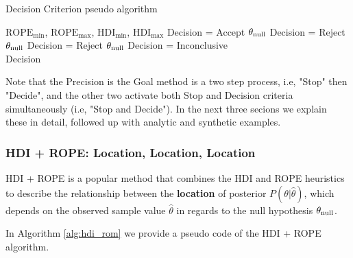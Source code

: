 \begin{algorithm}
    \caption{Decision Criterion pseudo algorithm}\label{alg:decision_criterion}
    \begin{algorithmic}
    \Require $\mathrm{ROPE}_\mathrm{min}$, $\mathrm{ROPE}_\mathrm{max}$, $\mathrm{HDI}_\mathrm{min}$, $\mathrm{HDI}_\mathrm{max}$
        \State Decision = Accept $\theta_{\rm null}$ 
        \State Decision = Reject $\theta_{\rm null}$ 
        \State Decision = Reject $\theta_{\rm null}$ 
    \Else
    \State Decision = Inconclusive  
    \EndIf \\
    \Return Decision
    \end{algorithmic} 
    
\end{algorithm}


Note that the Precision is the Goal method is a two step process, 
i.e, "Stop" then "Decide",
and the other two activate both Stop and Decision criteria simultaneously
(i.e, "Stop and Decide"). In the next three secions we explain these in detail,
followed up with analytic and synthetic examples.


\subsubsection{HDI + ROPE: Location, Location, Location}

HDI + ROPE is a popular method that combines the HDI and ROPE heuristics to describe
the relationship between the \textbf{location} of posterior $P(\theta|\hat\theta)$, which depends on the observed
sample value $\hat\theta$ in regards to the
null hypothesis $\theta_{\rm null}$.

In Algorithm \ref{alg:hdi_rom} we provide a pseudo code of the HDI + ROPE algorithm.



